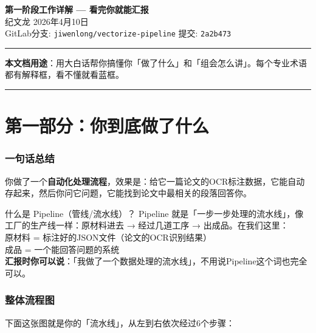 \documentclass[12pt,a4paper,landscape]{article}
\begin{document}
\begin{center}
  {\LARGE\bfseries 第一阶段工作详解 — 看完你就能汇报}\\[8pt]
  {\large 纪文龙 \quad 2026年4月10日}\\[4pt]
  {\small GitLab分支: \texttt{jiwenlong/vectorize-pipeline} \quad 提交: \texttt{2a2b473}}
\end{center}
\vspace{4mm}

\noindent\rule{\textwidth}{0.4pt}

\textbf{本文档用途}：用大白话帮你搞懂你「做了什么」和「组会怎么讲」。每个专业术语都有解释框，看不懂就看蓝框。

\noindent\rule{\textwidth}{0.4pt}
\vspace{4mm}

\part*{第一部分：你到底做了什么}

\section{一句话总结}

你做了一个\textbf{自动化处理流程}，效果是：给它一篇论文的OCR标注数据，它能自动存起来，然后你问它问题，它能找到论文中最相关的段落回答你。

\begin{termbox}{什么是 Pipeline（管线/流水线）？}
Pipeline 就是「一步一步处理的流水线」，像工厂的生产线一样：原材料进去 → 经过几道工序 → 出成品。在我们这里：\\[2pt]
\quad 原材料 = 标注好的JSON文件（论文的OCR识别结果）\\
\quad 成品 = 一个能回答问题的系统\\[2pt]
\textbf{汇报时你可以说}：「我做了一个数据处理的流水线」，不用说Pipeline这个词也完全可以。
\end{termbox}

\section{整体流程图}

下面这张图就是你的「流水线」，从左到右依次经过6个步骤：
\end{document}
